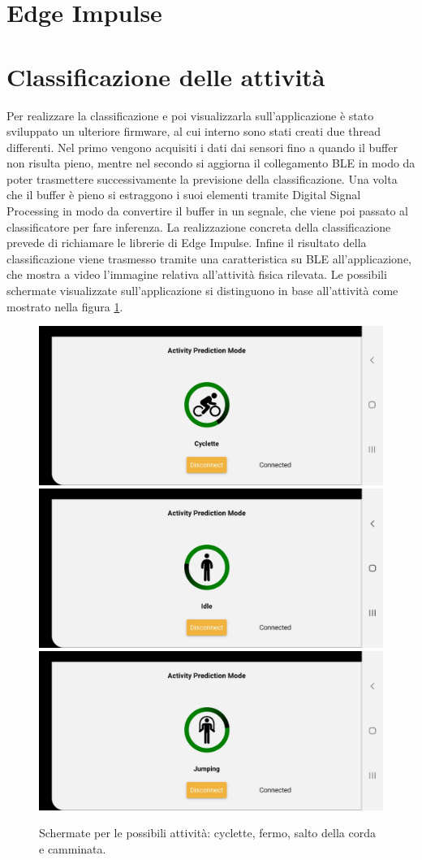 \section{Edge Impulse}

\section{Classificazione delle attività}
Per realizzare la classificazione e poi visualizzarla sull'applicazione è stato sviluppato un ulteriore firmware, al cui interno sono stati creati due thread differenti. Nel primo vengono acquisiti i dati dai sensori fino a quando il buffer non risulta pieno, mentre nel secondo si aggiorna il collegamento BLE in modo da poter trasmettere successivamente la previsione della classificazione. Una volta che il buffer è pieno si estraggono i suoi elementi tramite Digital Signal Processing in modo da convertire il buffer in un segnale, che viene poi passato al classificatore per fare inferenza. La realizzazione concreta della classificazione prevede di richiamare le librerie di Edge Impulse. Infine il risultato della classificazione viene trasmesso tramite una caratteristica su BLE all'applicazione, che mostra a video l'immagine relativa all'attività fisica rilevata. Le possibili schermate visualizzate sull'applicazione si distinguono in base all'attività come mostrato nella figura \ref{fig:attivitafisica}.

\begin{figure}[tbh]
	\centering
	\includegraphics[width=0.4\linewidth]{./ImageFiles/cyclette}
	\includegraphics[width=0.4\linewidth]{./ImageFiles/idle}
	\includegraphics[width=0.4\linewidth]{./ImageFiles/jumping}
	\caption{Schermate per le possibili attività: cyclette, fermo, salto della corda e camminata.}
	\label{fig:attivitafisica}
\end{figure}

